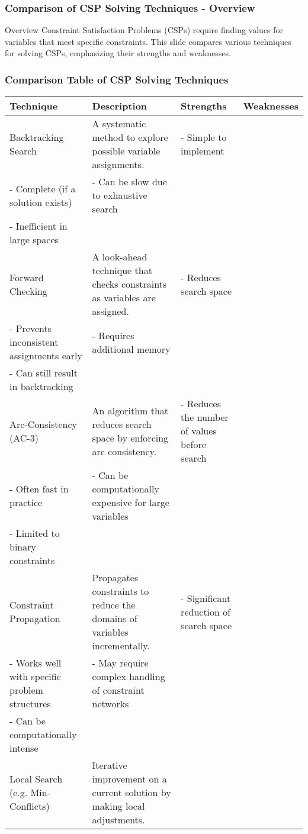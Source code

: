 \documentclass[aspectratio=169]{beamer}
\begin{document}
\begin{frame}[fragile]
    \frametitle{Comparison of CSP Solving Techniques - Overview}
    \begin{block}{Overview}
        Constraint Satisfaction Problems (CSPs) require finding values for variables that meet specific constraints. This slide compares various techniques for solving CSPs, emphasizing their strengths and weaknesses.
    \end{block}
\end{frame}

\begin{frame}[fragile]
    \frametitle{Comparison Table of CSP Solving Techniques}
    \centering
    \begin{tabular}{|l|l|l|l|}
        \hline
        \textbf{Technique} & \textbf{Description} & \textbf{Strengths} & \textbf{Weaknesses} \\
        \hline
        Backtracking Search & A systematic method to explore possible variable assignments. & 
        - Simple to implement \\ - Complete (if a solution exists) & 
        - Can be slow due to exhaustive search \\ - Inefficient in large spaces \\
        \hline
        Forward Checking & A look-ahead technique that checks constraints as variables are assigned. & 
        - Reduces search space \\ - Prevents inconsistent assignments early & 
        - Requires additional memory \\ - Can still result in backtracking \\
        \hline
        Arc-Consistency (AC-3) & An algorithm that reduces search space by enforcing arc consistency. & 
        - Reduces the number of values before search \\ - Often fast in practice & 
        - Can be computationally expensive for large variables \\ - Limited to binary constraints \\
        \hline
        Constraint Propagation & Propagates constraints to reduce the domains of variables incrementally. & 
        - Significant reduction of search space \\ - Works well with specific problem structures & 
        - May require complex handling of constraint networks \\ - Can be computationally intense \\
        \hline
        Local Search (e.g. Min-Conflicts) & Iterative improvement on a current solution by making local adjustments. & 

\end{tabular}
\end{frame}
\end{document}
